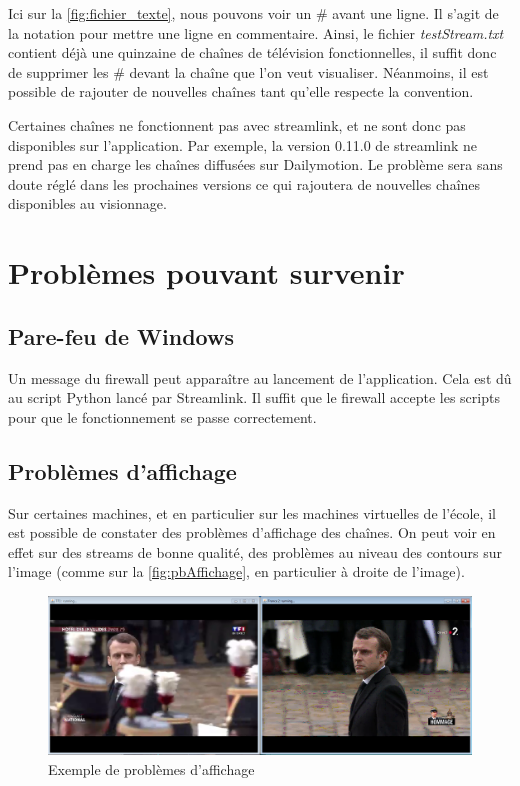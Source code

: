 \documentclass{polytech/polytech}
\begin{document}
Ici sur la \autoref{fig:fichier_texte}, nous pouvons voir un \# avant une ligne. Il s'agit de la notation pour mettre une ligne en commentaire. Ainsi, le fichier \textit{testStream.txt} contient déjà une quinzaine de chaînes de télévision fonctionnelles, il suffit donc de supprimer les \# devant la chaîne que l'on veut visualiser. Néanmoins, il est possible de rajouter de nouvelles chaînes tant qu'elle respecte la convention. 

Certaines chaînes ne fonctionnent pas avec streamlink, et ne sont donc pas disponibles sur l'application. Par exemple, la version 0.11.0 de streamlink ne prend pas en charge les chaînes diffusées sur Dailymotion. Le problème sera sans doute réglé dans les prochaines versions ce qui rajoutera de nouvelles chaînes disponibles au visionnage. 


\section{Problèmes pouvant survenir}



\subsection{Pare-feu de Windows}

Un message du firewall peut apparaître au lancement de l'application. Cela est dû au script Python lancé par Streamlink. Il suffit que le firewall accepte les scripts pour que le fonctionnement se passe correctement. 


\subsection{Problèmes d'affichage}

Sur certaines machines, et en particulier sur les machines virtuelles de l'école, il est possible de constater des problèmes d'affichage des chaînes. On peut voir en effet sur des streams de bonne qualité, des problèmes au niveau des contours sur l'image (comme sur la \autoref{fig:pbAffichage}, en particulier à droite de l'image).


\begin{figure}
	\includegraphics[scale=0.37]{images/imageQualite.png}
	\caption{Exemple de problèmes d'affichage}
	\label{fig:pbAffichage}
\end{figure}
\end{document}

